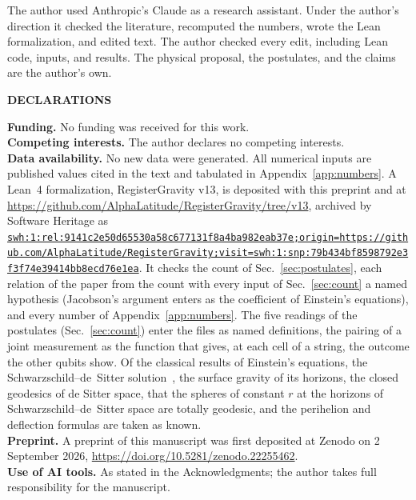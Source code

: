 \documentclass[aps,prd,twocolumn,superscriptaddress,nofootinbib,showkeys]{revtex4-2}
\newcommand{\swhid}[1]{{\def\UrlBreaks{\do\:\do\;\do\=\do\/\do\.\do0\do1\do2\do3\do4\do5\do6\do7\do8\do9\do a\do b\do c\do d\do e\do f}\href{https://archive.softwareheritage.org/#1}{\nolinkurl{#1}}}}
\begin{document}
\begin{acknowledgments}
The author used Anthropic's Claude as a research assistant. Under the author's direction it checked the literature, recomputed the numbers, wrote the Lean formalization, and edited text. The author checked every edit, including Lean code, inputs, and results. The physical proposal, the postulates, and the claims are the author's own.
\end{acknowledgments}

\par\medskip\centerline{\small\bfseries DECLARATIONS}\par\smallskip
\noindent\textbf{Funding.} No funding was received for this work.\\
\textbf{Competing interests.} The author declares no competing interests.\\
\textbf{Data availability.} No new data were generated. All numerical inputs are published values cited in the text and tabulated in Appendix~\ref{app:numbers}. A Lean~4 formalization, RegisterGravity v13, is deposited with this preprint and at \url{https://github.com/AlphaLatitude/RegisterGravity/tree/v13}, archived by Software Heritage as \swhid{swh:1:rel:9141c2e50d65530a58c677131f8a4ba982eab37e;origin=https://github.com/AlphaLatitude/RegisterGravity;visit=swh:1:snp:79b434bf8598792e3f3f74e39414bb8ecd76e1ea}. It checks the count of Sec.~\ref{sec:postulates}, each relation of the paper from the count with every input of Sec.~\ref{sec:count} a named hypothesis (Jacobson's argument enters as the coefficient of Einstein's equations), and every number of Appendix~\ref{app:numbers}. The five readings of the postulates (Sec.~\ref{sec:count}) enter the files as named definitions, the pairing of a joint measurement as the function that gives, at each cell of a string, the outcome the other qubits show. Of the classical results of Einstein's equations, the Schwarzschild--de~Sitter solution~\cite{kottler1918}, the surface gravity of its horizons, the closed geodesics of de Sitter space, that the spheres of constant $r$ at the horizons of Schwarzschild--de~Sitter space are totally geodesic, and the perihelion and deflection formulas are taken as known.\\
\textbf{Preprint.} A preprint of this manuscript was first deposited at Zenodo on 2 September 2026, \url{https://doi.org/10.5281/zenodo.22255462}.\\
\textbf{Use of AI tools.} As stated in the Acknowledgments; the author takes full responsibility for the manuscript.
\end{document}

